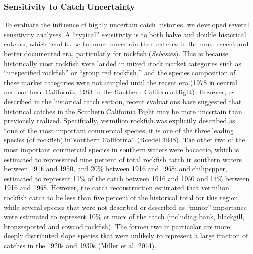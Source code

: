 \documentclass[11pt,
  english,
]{article}
\begin{document}

\hypertarget{sensitivity-to-catch-uncertainty}{%
\subsubsection{Sensitivity to Catch Uncertainty}\label{sensitivity-to-catch-uncertainty}}

\leavevmode\tagmcend\tagstructend

To evaluate the influence of highly uncertain catch histories, we developed several sensitivity analyses. A ``typical'' sensitivity is to both halve and double historical catches, which tend to be far more uncertain than catches in the more recent and better documented era, particularly for rockfish (\emph{Sebastes}). This is because historically most rockfish were landed in mixed stock market categories such as ``unspecified rockfish'' or ``group red rockfish,'' and the species composition of these market categories were not sampled until the recent era (1978 in central and northern California, 1983 in the Southern California Bight). However, as described in the historical catch section, recent evaluations have suggested that historical catches in the Southern California Bight may be more uncertain than previously realized. Specifically, vermilion rockfish was explicitly described as ``one of the most important commercial species, it is one of the three leading species (of rockfish) in''southern California'' {(Roedel 1948)\leavevmode\tagmcend\tagstructend}. The other two of the most important commercial species in southern waters were bocaccio, which is estimated to represented nine percent of total rockfish catch in southern waters between 1916 and 1950, and 20\% between 1916 and 1968; and chilipepper, estimated to represent 11\% of the catch between 1916 and 1950 and 14\% between 1916 and 1968. However, the catch reconstruction estimated that vermilion rockfish catch to be less than five percent of the historical total for this region, while several species that were not described or described as ``minor'' importance were estimated to represent 10\% or more of the catch (including bank, blackgill, bronzespotted and cowcod rockfish). The former two in particular are more deeply distributed slope species that were unlikely to represent a large fraction of catches in the 1920s and 1930s {(Miller et al. 2014)\leavevmode\tagmcend\tagstructend}.
\end{document}
